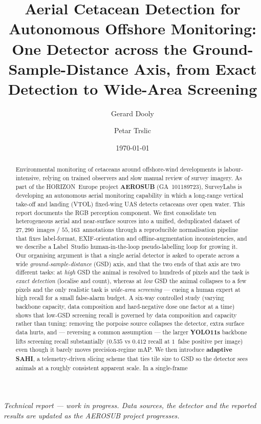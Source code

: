 \documentclass[11pt,a4paper]{article}
\title{\bfseries Aerial Cetacean Detection for Autonomous Offshore
Monitoring: One Detector across the Ground-Sample-Distance Axis, from
Exact Detection to Wide-Area Screening}
\author[1]{Gerard Dooly}
\author[1]{Petar Trslic}
\affil[1]{SurveyLabs Ltd., Ireland \\ \texttt{\{gerard.dooly, petar.trslic\}@surveylabs.ie}}
\date{\today}
\newcommand{\map}{mAP}
\begin{document}
\maketitle

\begin{center}\small\itshape
Technical report --- work in progress. Data sources, the detector and the
reported results are updated as the AEROSUB project progresses.
\end{center}

\begin{abstract}
Environmental monitoring of cetaceans around offshore-wind developments is
labour-intensive, relying on trained observers and slow manual review of survey
imagery. As part of the HORIZON~Europe project \textbf{AEROSUB}
(GA~101189723), SurveyLabs is developing an autonomous aerial monitoring
capability in which a long-range vertical take-off and landing (VTOL)
fixed-wing UAS detects cetaceans over open water. This report documents the
RGB perception component. We first consolidate ten heterogeneous aerial and
near-surface sources into a unified, deduplicated dataset of $27{,}290$~images
/ $55{,}163$~annotations through a reproducible normalisation pipeline that
fixes label-format, EXIF-orientation and offline-augmentation inconsistencies,
and we describe a Label~Studio human-in-the-loop pseudo-labelling loop for
growing it. Our organising argument is that a single aerial detector is
asked to operate across a wide \emph{ground-sample-distance} (GSD) axis, and
that the two ends of that axis are two different tasks: at \emph{high} GSD the
animal is resolved to hundreds of pixels and the task is \emph{exact
detection} (localise and count), whereas at \emph{low} GSD the animal collapses
to a few pixels and the only realistic task is \emph{wide-area screening} ---
cueing a human expert at high recall for a small false-alarm budget. A six-way controlled study
(varying backbone capacity, data composition and hard-negative dose one factor
at a time) shows that low-GSD screening recall is governed by data composition
and capacity rather than tuning: removing the porpoise source collapses the
detector, extra surface data hurts, and --- reversing a common assumption ---
the larger \textbf{YOLO11s} backbone lifts screening recall substantially
($0.535$ vs $0.412$ recall at $1$~false positive per image) even though it
barely moves precision-regime \map. We then introduce \textbf{adaptive SAHI}, a
telemetry-driven slicing scheme that ties tile size to GSD so the detector
sees animals at a roughly consistent apparent scale. In a single-frame

\end{abstract}
\end{document}
